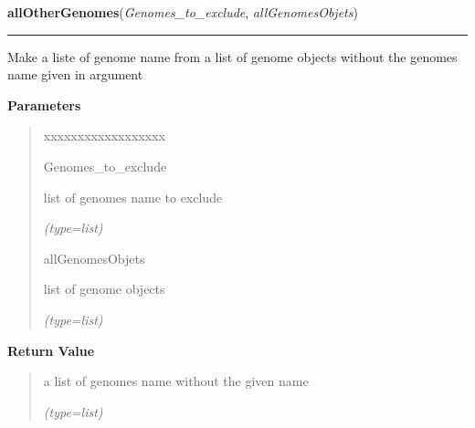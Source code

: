 \hspace{.8\funcindent}\begin{boxedminipage}{\funcwidth}

    \raggedright \textbf{allOtherGenomes}(\textit{Genomes\_to\_exclude}, \textit{allGenomesObjets})

    \vspace{-1.5ex}

    \rule{\textwidth}{0.5\fboxrule}
\setlength{\parskip}{2ex}
    Make a liste of genome name from a list of genome objects without the 
    genomes name given in argument

\setlength{\parskip}{1ex}
      \textbf{Parameters}
      \vspace{-1ex}

      \begin{quote}
        \begin{Ventry}{xxxxxxxxxxxxxxxxxx}

          \item[Genomes\_to\_exclude]

          list of genomes name to exclude

            {\it (type=list)}

          \item[allGenomesObjets]

          list of genome objects

            {\it (type=list)}

        \end{Ventry}

      \end{quote}

      \textbf{Return Value}
    \vspace{-1ex}

      \begin{quote}
      a list of genomes name without the given name

      {\it (type=list)}

      \end{quote}

    \end{boxedminipage}

    \label{script-phyloFixedVar:addNodeNameNewick}

    \vspace{0.5ex}

